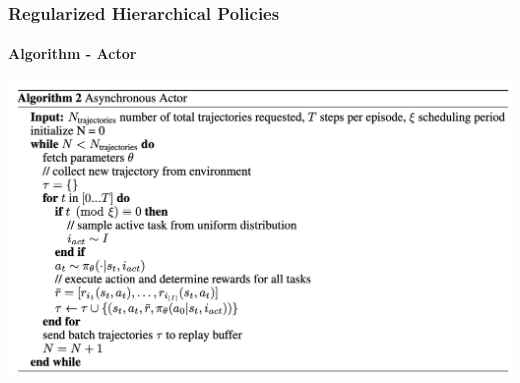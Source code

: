 \documentclass{beamer}
\begin{document}
\begin{frame}
	\frametitle{Regularized Hierarchical Policies}
	\framesubtitle{Algorithm - Actor}
	
	\begin{center}
		\includegraphics[scale=0.25]{algorithm-actor}
	\end{center}
	
\end{frame}

\end{document}
